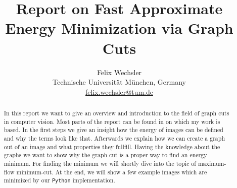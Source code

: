 \documentclass[runningheads,a4paper]{llncs}
\begin{document}
\mainmatter  %

\title{Report on Fast Approximate Energy Minimization via Graph Cuts}




\author{%
Felix Wechsler\\Technische Universit{\"a}t M{\"u}nchen, Germany \\ \href{mailto:felix.wechsler@tum.de}{felix.wechsler@tum.de}%
} 

\maketitle



\def\abswap{$\alpha$-$\beta$-swap }
\def\aexp{$\alpha$-expansion } 


\begin{abstract}
In this report we want to give an overview and introduction to the field of graph cuts in computer vision. 
Most parts of the report can be found in \cite{paper} on which my work is based. 
In the first steps we give an insight how the energy of images can be defined and why the terms look like that.
Afterwards we explain how we can create a graph out of an image and what properties they fullfill. Having the knowledge about the graphs 
we want to show why the graph cut is a proper way to find an energy minimum. For finding the minimum
we will shortly dive into the topic of maximum-flow minimum-cut. 
At the end, we will show a few example images which are minimized by our \texttt{Python} implementation.
\end{abstract}
\end{document}
